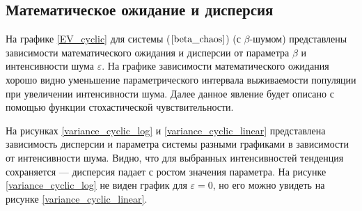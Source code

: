 \subsection{Математическое ожидание и дисперсия}

    На графике \ref{EV_cyclic} для системы (\(\ref{beta_chaos}\)) (с \(\beta\)-шумом) представлены зависимости математического ожидания и дисперсии от параметра \(\beta\) и интенсивности шума \(\varepsilon\). На графике зависимости математического ожидания хорошо видно уменьшение параметрического интервала выживаемости популяции при увеличении интенсивности шума. Далее данное явление будет описано с помощью функции стохастической чувствительности.

    На рисунках \ref{variance_cyclic_log} и \ref{variance_cyclic_linear} представлена зависимость дисперсии и параметра системы разными графиками в зависимости от интенсивности шума. Видно, что для выбранных интенсивностей тенденция сохраняется --- дисперсия падает с ростом значения параметра. На рисунке \ref{variance_cyclic_log} не виден график для \(\varepsilon = 0\), но его можно увидеть на рисунке \ref{variance_cyclic_linear}.

